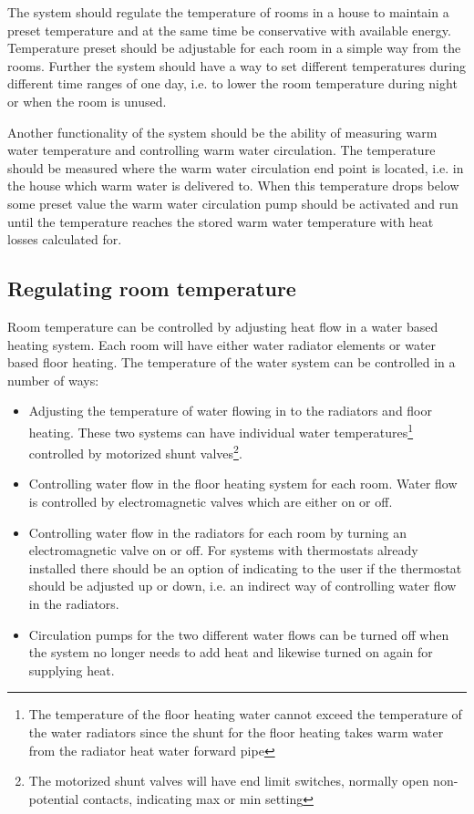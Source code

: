 The system should regulate the temperature of rooms in a house to
maintain a preset temperature and at the same time be conservative
with available energy. Temperature preset should be adjustable for
each room in a simple way from the rooms. Further the system should
have a way to set different temperatures during different time ranges
of one day, i.e. to lower the room temperature during night or when
the room is unused.

Another functionality of the system should be the ability of measuring
warm water temperature and controlling warm water circulation. The
temperature should be measured where the warm water circulation end
point is located, i.e. in the house which warm water is delivered
to. When this temperature drops below some preset value the warm water
circulation pump should be activated and run until the temperature
reaches the stored warm water temperature with heat losses calculated
for. 

\subsection{Regulating room temperature}
Room temperature can be controlled by adjusting
heat flow in a water based heating system. Each room will have either
water radiator elements or water based floor heating. The temperature
of the water system can be controlled in a number of ways:
\begin{itemize}
\item{Adjusting the temperature of water flowing in to the radiators
  and floor heating. These two systems can have individual water
  temperatures\footnote{The temperature of the floor heating water
    cannot exceed the temperature of the water radiators since the
    shunt for the floor heating takes warm water from the radiator
    heat water forward pipe} controlled by motorized shunt
  valves\footnote{The motorized shunt valves will have end limit
    switches, normally open non-potential contacts, indicating max or
    min setting}.}
\item{Controlling water flow in the floor heating system for each
  room. Water flow is controlled by electromagnetic valves which are
  either on or off.}
\item{Controlling water flow in the radiators for each room by turning
  an electromagnetic valve on or off. For systems with thermostats already
  installed there should be an option of indicating to the user if the
  thermostat should be adjusted up or down, i.e. an indirect way of
  controlling water flow in the radiators.}
\item{Circulation pumps for the two different water flows can be
  turned off when the system no longer needs to add heat and likewise
  turned on again for supplying heat.}
\end{itemize}

